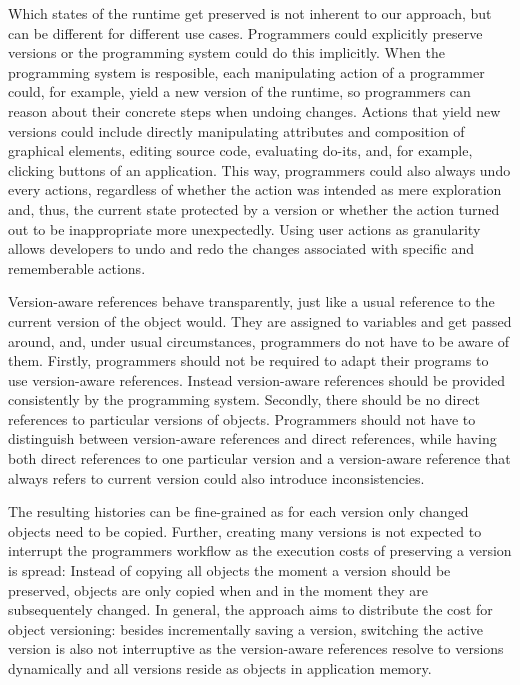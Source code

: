 

Which states of the runtime get preserved is not inherent to our approach, but can be different for different use cases. %
Programmers could explicitly preserve versions or the programming system could do this implicitly.
When the programming system is resposible, each manipulating action of a programmer could, for example, yield a new version of the runtime, so programmers can reason about their concrete steps when undoing changes.
Actions that yield new versions could include directly manipulating attributes and composition of graphical elements, editing source code, evaluating do-its, and, for example, clicking buttons of an application.
This way, programmers could also always undo every actions, regardless of whether the action was intended as mere exploration and, thus, the current state protected by a version or whether the action turned out to be inappropriate more unexpectedly.
Using user actions as granularity allows developers to undo and redo the changes associated with specific and rememberable actions.




Version-aware references behave transparently, just like a usual reference to the current version of the object would.
They are assigned to variables and get passed around, and, under usual circumstances, programmers do not have to be aware of them.
Firstly, programmers should not be required to adapt their programs to use version-aware references.
Instead version-aware references should be provided consistently by the programming system.
Secondly, there should be no direct references to particular versions of objects.
Programmers should not have to distinguish between version-aware references and direct references, while having both direct references to one particular version and a version-aware reference that always refers to current version could also introduce inconsistencies.



The resulting histories can be fine-grained as for each version only changed objects need to be copied.
Further, creating many versions is not expected to interrupt the programmers workflow as the execution costs of preserving a version is spread: Instead of copying all objects the moment a version should be preserved, objects are only copied when and in the moment they are subsequentely changed.
In general, the approach aims to distribute the cost for object versioning: besides incrementally saving a version, switching the active version is also not interruptive as the version-aware references resolve to versions dynamically and all versions reside as objects in application memory.


